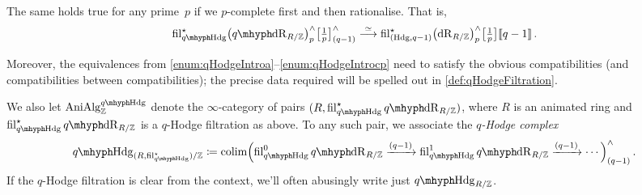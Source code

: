 \documentclass[DIV=12,numbers=enddot,leqno,bibliography=totoc]{scrartcl}
\begin{document}
\begin{defi}
\begin{alphanumerate}
\begin{equation*}
			\end{equation*}
			\item[c_p] The same holds true for any prime~$p$ if we $p$-complete first and then rationalise. That is,\label{enum:qHodgeIntrocp}
			\begin{equation*}
				\fil_{\qHodge}^\star\bigl(\qdeRham_{R/\IZ}\bigr)_p^\complete\bigl[\localise{p}\bigr]_{(q-1)}^\complete\overset{\simeq}{\longrightarrow}\fil_{(\Hodge,q-1)}^\star\bigl(\deRham_{R/\IZ}\bigr)_p^\complete\bigl[\localise{p}\bigr]\qpower\,.
			\end{equation*}
		\end{alphanumerate}
		Moreover, the equivalences from \cref{enum:qHodgeIntroa}--\cref{enum:qHodgeIntrocp} need to satisfy the obvious compatibilities (and compatibilities between compatibilities); the precise data required will be spelled out in \cref{def:qHodgeFiltration}.
		
		We also let $\cat{AniAlg}_{\IZ}^{\qHodge}$ denote the $\infty$-category of pairs $(R,\fil_{\qHodge}^\star\qdeRham_{R/\IZ})$, where $R$ is an animated ring and $\fil_{\qHodge}^\star\qdeRham_{R/\IZ}$ is a $q$-Hodge filtration as above. To any such pair, we associate the \emph{$q$-Hodge complex}
		\begin{equation*}
			\qHodge_{(R, \fil_{\smash{\qHodge}}^\star )/\IZ}\coloneqq \colimit\Bigl( \fil_{\qHodge}^0\qdeRham_{R/\IZ}\xrightarrow{(q-1)} \fil_{\qHodge}^1\qdeRham_{R/\IZ}\xrightarrow{(q-1)}\dotsb\Bigr)_{(q-1)}^\complete\,.
		\end{equation*}
		If the $q$-Hodge filtration is clear from the context, we'll often abusingly write just $\qHodge_{R/\IZ}$.
	\end{defi}
	
\end{document}

